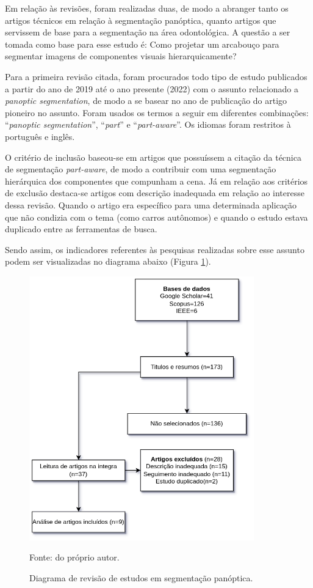 Em relação às revisões, foram realizadas duas, de modo a abranger tanto os artigos técnicos em relação à segmentação panóptica, quanto artigos que servissem de base para a segmentação na área odontológica. A questão a ser tomada como base para esse estudo é: Como projetar um arcabouço para segmentar imagens de componentes visuais hierarquicamente?

Para a primeira revisão citada, foram procurados todo tipo de estudo publicados a partir do ano de 2019 até o ano presente (2022) com o assunto relacionado a \textit{panoptic segmentation}, de modo a se basear no ano de publicação do artigo pioneiro \cite{Kirillov2019a} no assunto. Foram usados os termos a seguir em diferentes combinações: ``\textit{panoptic segmentation}'', ``\textit{part}'' e ``\textit{part-aware}''. Os idiomas foram restritos à português e inglês.

O critério de inclusão baseou-se em artigos que possuíssem a citação da técnica de segmentação \textit{part-aware}, de modo a contribuir com uma segmentação hierárquica dos componentes que compunham a cena. Já em relação aos critérios de exclusão destaca-se artigos com descrição inadequada em relação ao interesse dessa revisão. Quando o artigo era específico para uma determinada aplicação que não condizia com o tema (como carros autônomos) e quando o estudo estava duplicado entre as ferramentas de busca.

Sendo assim, os indicadores referentes às pesquisas realizadas sobre esse assunto podem ser visualizadas no diagrama abaixo (Figura \ref{project:revision:fig:1}).

\begin{figure}[H]
    \centering
    \caption{Diagrama de revisão de estudos em segmentação panóptica.}
    \includegraphics[height=4.5in]{recursos/imagens/project/revisao_panoptica.png}
    \label{project:revision:fig:1}

    Fonte: do próprio autor.
\end{figure}

